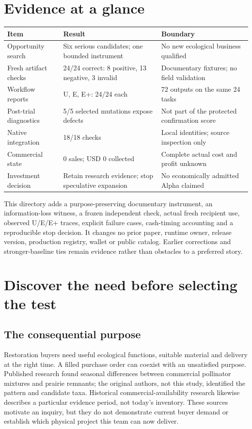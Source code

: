 \documentclass[11pt]{article}
\begin{document}
\section*{Evidence at a glance}
\begin{tabularx}{\textwidth}{@{}lY Y@{}}
\toprule
Item & Result & Boundary\\\midrule
Opportunity search & Six serious candidates; one bounded instrument & No new ecological business qualified\\
Fresh artifact checks & 24/24 correct: 8 positive, 13 negative, 3 invalid & Documentary fixtures; no field validation\\
Workflow reports & U, E, E+: 24/24 each & 72 outputs on the same 24 tasks\\
Post-trial diagnostics & 5/5 selected mutations expose defects & Not part of the protected confirmation score\\
Native integration & 18/18 checks & Local identities; source inspection only\\
Commercial state & 0 sales; USD 0 collected & Complete actual cost and profit unknown\\
Investment decision & Retain research evidence; stop speculative expansion & No economically admitted Alpha claimed\\
\bottomrule
\end{tabularx}

\endgroup
\clearpage
\setcounter{tocdepth}{1}
\tableofcontents
\vspace{8mm}
\begin{finding}[title=What this edition adds]
This directory adds a purpose-preserving documentary instrument, an information-loss witness, a frozen independent check, actual fresh recipient use, observed U/E/E+ traces, explicit failure cases, cash-timing accounting and a reproducible stop decision. It changes no prior paper, runtime owner, release version, production registry, wallet or public catalog. Earlier corrections and stronger-baseline ties remain evidence rather than obstacles to a preferred story.
\end{finding}

\section{Discover the need before selecting the test}
\subsection{The consequential purpose}
Restoration buyers need useful ecological functions, suitable material and delivery at the right time. A filled purchase order can coexist with an unsatisfied purpose. Published research found seasonal differences between commercial pollinator mixtures and prairie remnants; the original authors, not this study, identified the pattern and candidate taxa. Historical commercial-availability research likewise describes a particular evidence period, not today's inventory. These sources motivate an inquiry, but they do not demonstrate current buyer demand or establish which physical project this team can now deliver.\cite{zinnen,availability}
\end{document}
